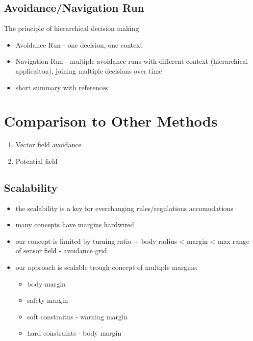 \subsection{Avoidance/Navigation Run}\label{s:conclusionAvoidanceNavigationRun}

\noindent The principle of hierarchical decision making
\begin{itemize}
    \item Avoidance Run - one decision, one context
    \item Navigation Run - multiple avoidance runs with different context (hierarchical applicaiton), joining multiple decisions over time
    \item short summary with references
\end{itemize}


\section{Comparison to Other Methods}\label{s:OtherMethodsComparison}

\begin{enumerate}
	\item Vector field avoidance \cite{borenstein1991vector}
	\item Potential field \cite{koren1991potential}
\end{enumerate}

\subsection{Scalability}\label{s:conclusionScalability}

\begin{itemize}
    \item the scalability is a key for everchanging rules/regulations accomodations
    
    \item many concepts have margins hardwired
    
    \item our concept is limited by turning ratio + body radius < margin < max range of sensor field - avoidance grid
    
    \item our approach is scalable trough concept of multiple  margins:
    \begin{itemize}
        \item body margin
        \item safety margin
        \item soft constraitns - warning margin
        \item hard constraints - body margin
    \end{itemize}
    
\end{itemize}

